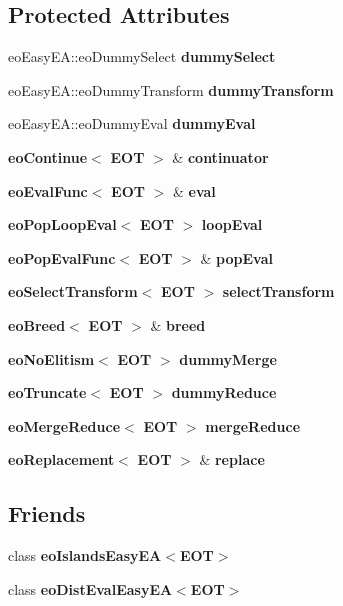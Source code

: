 \subsection*{Protected Attributes}
\begin{CompactItemize}
\item 
eo\-Easy\-EA::eo\-Dummy\-Select {\bf dummy\-Select}\label{classeo_easy_e_a_p0}

\item 
eo\-Easy\-EA::eo\-Dummy\-Transform {\bf dummy\-Transform}\label{classeo_easy_e_a_p1}

\item 
eo\-Easy\-EA::eo\-Dummy\-Eval {\bf dummy\-Eval}\label{classeo_easy_e_a_p2}

\item 
{\bf eo\-Continue}$<$ {\bf EOT} $>$ \& {\bf continuator}\label{classeo_easy_e_a_p3}

\item 
{\bf eo\-Eval\-Func}$<$ {\bf EOT} $>$ \& {\bf eval}\label{classeo_easy_e_a_p4}

\item 
{\bf eo\-Pop\-Loop\-Eval}$<$ {\bf EOT} $>$ {\bf loop\-Eval}\label{classeo_easy_e_a_p5}

\item 
{\bf eo\-Pop\-Eval\-Func}$<$ {\bf EOT} $>$ \& {\bf pop\-Eval}\label{classeo_easy_e_a_p6}

\item 
{\bf eo\-Select\-Transform}$<$ {\bf EOT} $>$ {\bf select\-Transform}\label{classeo_easy_e_a_p7}

\item 
{\bf eo\-Breed}$<$ {\bf EOT} $>$ \& {\bf breed}\label{classeo_easy_e_a_p8}

\item 
{\bf eo\-No\-Elitism}$<$ {\bf EOT} $>$ {\bf dummy\-Merge}\label{classeo_easy_e_a_p9}

\item 
{\bf eo\-Truncate}$<$ {\bf EOT} $>$ {\bf dummy\-Reduce}\label{classeo_easy_e_a_p10}

\item 
{\bf eo\-Merge\-Reduce}$<$ {\bf EOT} $>$ {\bf merge\-Reduce}\label{classeo_easy_e_a_p11}

\item 
{\bf eo\-Replacement}$<$ {\bf EOT} $>$ \& {\bf replace}\label{classeo_easy_e_a_p12}

\end{CompactItemize}
\subsection*{Friends}
\begin{CompactItemize}
\item 
class {\bf eo\-Islands\-Easy\-EA$<$EOT$>$}\label{classeo_easy_e_a_n0}

\item 
class {\bf eo\-Dist\-Eval\-Easy\-EA$<$EOT$>$}\label{classeo_easy_e_a_n1}

\end{CompactItemize}


